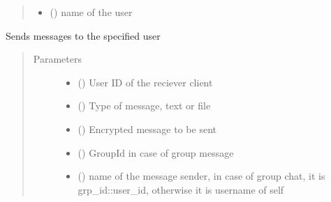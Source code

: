 \documentclass[letterpaper,10pt,english]{sphinxmanual}
\begin{document}
\begin{fulllineitems}
\begin{fulllineitems}
\begin{quote}
\begin{description}
\begin{itemize}
\item {} 
 () \textendash{} name of the user

\end{itemize}

\end{description}\end{quote}

\end{fulllineitems}


\begin{fulllineitems}
\label{\detokenize{Message:Message.Message._send_msg}}
Sends messages to the specified user
\begin{quote}\begin{description}
\item[{Parameters}] \leavevmode\begin{itemize}
\item {} 
 () \textendash{} User ID of the reciever client

\item {} 
 () \textendash{} Type of message, text or file

\item {} 
 () \textendash{} Encrypted message to be sent

\item {} 
 () \textendash{} GroupId in case of group message

\item {} 
 () \textendash{} name of the message sender, in case of group chat, it is grp\_id::user\_id, otherwise it is username of self


\end{itemize}
\end{description}
\end{quote}
\end{fulllineitems}
\end{fulllineitems}
\end{document}
